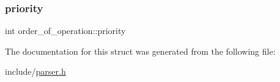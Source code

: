 \mbox{\label{structorder__of__operation_a473d1dd1e8d79cfa6c2e84bb7402da14}} 
\subsubsection{\texorpdfstring{priority}{priority}}
{\footnotesize\ttfamily int order\+\_\+of\+\_\+operation\+::priority}



The documentation for this struct was generated from the following file\+:\begin{DoxyCompactItemize}
\item 
include/\hyperlink{parser_8h}{parser.\+h}\end{DoxyCompactItemize}
